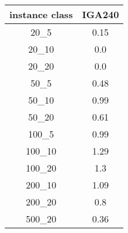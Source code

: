 \begin{tabular}{c|c|}
instance class & IGA240 \\ 
\hline
20_5         & 0.15         \\ 
20_10        & 0.0          \\ 
20_20        & 0.0          \\ 
50_5         & 0.48         \\ 
50_10        & 0.99         \\ 
50_20        & 0.61         \\ 
100_5        & 0.99         \\ 
100_10       & 1.29         \\ 
100_20       & 1.3          \\ 
200_10       & 1.09         \\ 
200_20       & 0.8          \\ 
500_20       & 0.36         \\ 
\end{tabular}